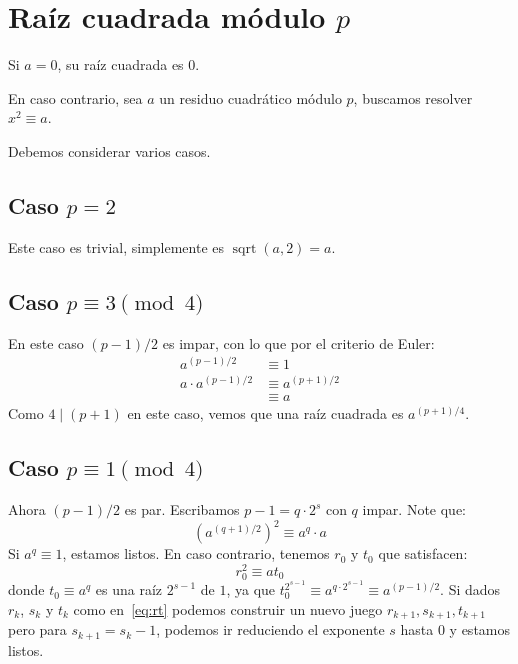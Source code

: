 \documentclass[english, german, spanish, fleqn]{article}
\begin{document}
\section{Raíz cuadrada módulo \(p\)}
\label{sec:sqrt-mod-p}

  Si \(a = 0\),
  su raíz cuadrada es \(0\).

  En caso contrario,
  sea \(a\) un residuo cuadrático módulo \(p\),
  buscamos resolver \(x^2 \equiv a\).

  Debemos considerar varios casos.

\subsection{Caso \(p = 2\)}
\label{sec:p=2}

  Este caso es trivial,
  simplemente es \(\operatorname{sqrt}(a, 2) = a\).

\subsection{Caso \(p \equiv 3 \pmod{4}\)}
\label{sec:p-equiv-3}

  En este caso \((p - 1) / 2\) es impar,
  con lo que por el criterio de Euler:
  \begin{align*}
    a^{(p - 1) / 2}
      &\equiv 1 \\
    a \cdot a^{(p - 1) / 2}
      &\equiv a^{(p + 1) / 2} \\
      &\equiv a
  \end{align*}
  Como \(4 \mid (p + 1)\) en este caso,
  vemos que una raíz cuadrada es \(a^{(p + 1) / 4}\).

\subsection{Caso \(p \equiv 1 \pmod{4}\)}
\label{sec:p-equiv-1}

  Ahora \((p - 1) / 2\) es par.
  Escribamos \(p - 1 = q \cdot 2^s\) con \(q\) impar.
  Note que:
  \begin{equation*}
    \left( a^{(q + 1) / 2} \right)^2
      \equiv a^q \cdot a
  \end{equation*}
  Si \(a^q \equiv 1\),
  estamos listos.
  En caso contrario,
  tenemos \(r_0\) y \(t_0\) que satisfacen:
  \begin{equation}
    \label{eq:rt}
    r_0^2
      \equiv a t_0
  \end{equation}
  donde \(t_0 \equiv a^q\) es una raíz \(2^{s - 1}\) de \(1\),
  ya que \(t_0^{2^{s - 1}} \equiv a^{q \cdot 2^{s - 1}} \equiv a^{(p - 1) / 2}\).
  Si dados \(r_k\), \(s_k\) y \(t_k\) como en~\eqref{eq:rt}
  podemos construir un nuevo juego \(r_{k + 1}, s_{k + 1}, t_{k + 1}\)
  pero para \(s_{k + 1} = s_k - 1\),
  podemos ir reduciendo el exponente \(s\) hasta \(0\) y estamos listos.
\end{document}
